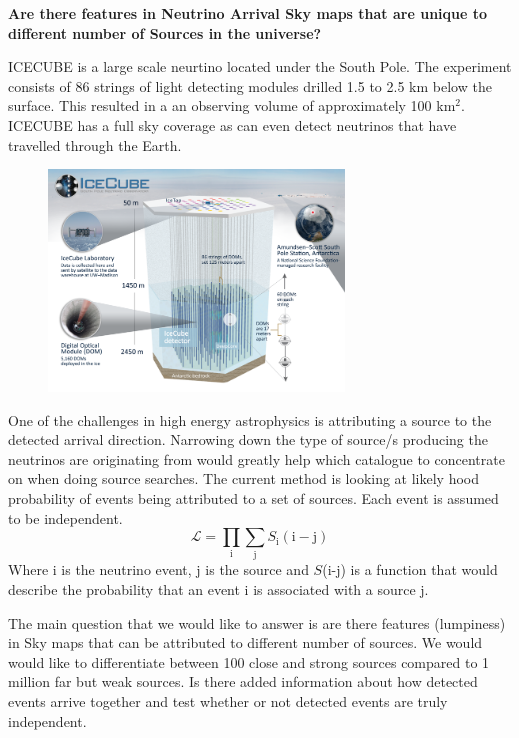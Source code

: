 \documentclass[a4paper,12pt,twoside,openright]{article}
\begin{document}
\begin{center}
\huge \textbf{Are there features in Neutrino Arrival Sky maps that are unique to different number of Sources in the universe?}
\end{center}



\normalsize
ICECUBE is a large scale neurtino located under the South Pole. The experiment consists of 86 strings of light detecting modules drilled 1.5 to 2.5 km below the surface. This resulted in a an observing volume of approximately 100 km$^2$. ICECUBE has a full sky coverage as can even detect neutrinos that have travelled through the Earth. 

\begin{figure}[h]
\centering
\includegraphics[width=0.7\textwidth]{icecube_detector_sm.png}
\end{figure}


One of the challenges in high energy astrophysics is attributing a source to the detected arrival direction. Narrowing down the type of source/s producing the neutrinos are originating from would greatly help which catalogue to concentrate on when doing source searches. The current method is looking at likely hood probability of events being attributed to a set of sources. Each event is assumed to be independent.
\begin{equation}
\mathcal{L} = \prod_{\mathrm{i}} \sum_{\mathrm{j}} S_{\mathrm{i}}(\mathrm{i} - \mathrm{j})
\end{equation}
Where i is the neutrino event, j is the source and $S$(i-j) is a function that would describe the probability that an event i is associated with a source j.

The main question that we would like to answer is are there features (lumpiness) in Sky maps that can be attributed to different number of sources. We would would like to differentiate between 100 close and strong sources compared to 1 million far but weak sources. Is there added information about how detected events arrive together and test whether or not detected events are truly independent.
\end{document}

